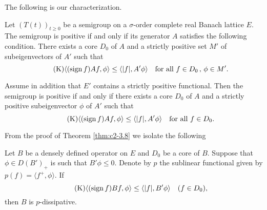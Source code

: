 The following is our characterization.
\begin{theorem}\label{thm:c2-3.8}
Let $(T(t))_{t \geq 0}$ be a semigroup on a $\sigma$-order complete real Banach lattice $E$. 
The semigroup is positive if and only if its generator $A$ satisfies the following condition.
There exists a core $D_{0}$ of $A$ and a strictly positive set $M'$ of subeigenvectors of $A'$ such that
\begin{equation}\label{eq:c2-K4} \tag{K}
\langle(\operatorname{sign} f) Af,\phi \rangle \leq \langle|f|,A'\phi\rangle \quad \text{for all } f \in D_{0} \, , \, \phi \in M'.
\end{equation}
\end{theorem}
\begin{corollary}\label{cor:c2-3.9}
Assume in addition that $E'$ contains a strictly positive functional. 
Then the semigroup is positive if and only if there
exists a core $D_{0}$ of $A$ and a strictly positive subeigenvector $\phi$
of $A'$ such that
\begin{equation}\label{eq:c2-K5} \tag{K}
\langle(\operatorname{sign} f) Af,\phi \rangle \leq \langle|f|,A'\phi\rangle \quad \text{for all } f \in D_{0}.
\end{equation}
\end{corollary}
From the proof of Theorem \ref{thm:c2-3.8}   we isolate the following
\begin{proposition}\label{prop:c2-3.10}
Let $B$ be a densely defined operator on $E$ and $D_{0}$ be a core of $B$.
Suppose that $\phi \in D(B')_{+}$ is such that $B'\phi \leq 0$.
Denote by $p$ the sublinear functional given by $p(f) = \langle f^{+},\phi \rangle$. 
If
\begin{equation*}\label{eq:c2-K6} \tag{K}
	\langle(\operatorname{sign} f) Bf,\phi \rangle \leq \langle|f|,B'\phi\rangle \quad (f \in D_{0}),
\end{equation*}
then $B$ is $p$-dissipative.
\end{proposition}
